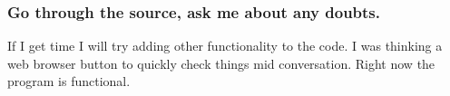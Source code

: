\subsubsection*{Go through the source, ask me about any doubts.}

If I get time I will try adding other functionality to the code. I was thinking a web browser button to quickly check things mid conversation. Right now the program is functional. 